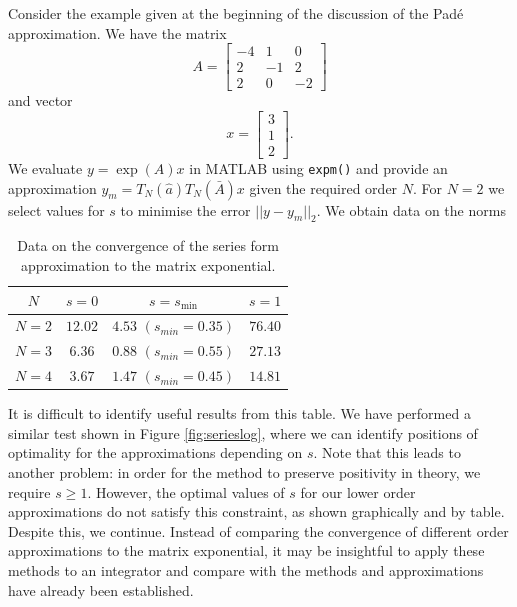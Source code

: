 Consider the example given at the beginning of the discussion of the Pad\'e approximation.
We have the matrix
\begin{equation*}
    A = \begin{bmatrix}
        -4 & 1 & 0 \\
        2 & -1 & 2 \\
        2 & 0 & -2
    \end{bmatrix}
\end{equation*}
and vector
\begin{equation*}
    x = \begin{bmatrix}
        3 \\
        1 \\
        2
    \end{bmatrix}.
\end{equation*}
We evaluate $y = \exp(A)x$ in MATLAB using \texttt{expm()} and provide an approximation $y_m = T_N(\hat{a})T_N(\bar{A})x$ given the required order $N$.
For $N=2$ we select values for $s$ to minimise the error $||y-y_m||_2$.
We obtain data on the norms
\begin{table}[h!]  %
    \centering
    \begin{tabular}{c | c | c | c}
    $N$   & $s=0$ & $s=s_\mathrm{min}$ & $s=1$ \\ \hline
    $N=2$ & $12.02$   & $4.53$ $(s_{min}=0.35)$    & $76.40$   \\
    $N=3$ & $6.36$   & $0.88$ $(s_{min} = 0.55)$    & $27.13$   \\
    $N=4$ & $3.67$   & $1.47$ $(s_{min} = 0.45)$    & $14.81$  
    \end{tabular}
    \caption{
        Data on the convergence of the series form approximation to the matrix exponential.
    }
\end{table}
It is difficult to identify useful results from this table.
We have performed a similar test shown in Figure \ref{fig:serieslog}, where we can identify positions of optimality for the approximations depending on $s$.
Note that this leads to another problem: in order for the method to preserve positivity in theory, we require $s \ge 1$.
However, the optimal values of $s$ for our lower order approximations do not satisfy this constraint, as shown graphically and by table.
Despite this, we continue. 
Instead of comparing the convergence of different order approximations to the matrix exponential,
it may be insightful to apply these methods to an integrator and compare with the methods and approximations have already been established.

